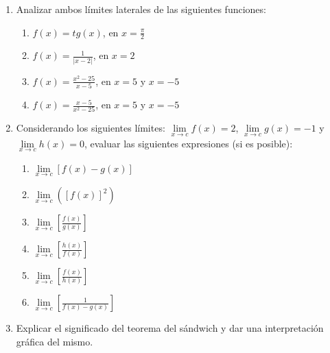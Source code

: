 \documentclass[12pt]{article}
\theoremstyle{definition}
\newtheorem*{myteo2}{Teorema}
\begin{document}
\begin{enumerate}
\item Analizar ambos límites laterales de las siguientes funciones:

\begin{multicols}{2}
	\begin{enumerate}
		\item $f(x) = tg(x)$, en $x = \frac{\pi}{2}$
		\item $f(x) = \frac{1}{|x - 2|}$, en $x = 2$
		\item $f(x) = \frac{x^2 - 25}{x - 5}$, en $x = 5$ y $x = -5$		
		\item $f(x) = \frac{x - 5}{x^2 - 25}$, en $x = 5$ y $x = -5$	
	\end{enumerate}
\end{multicols}

\item Considerando los siguientes límites: $\lim\limits_{x \to c} f(x) = 2$, $\lim\limits_{x \to c} g(x) = -1$ y $\lim\limits_{x \to c} h(x) = 0$, evaluar las siguientes expresiones (si es posible):

\begin{multicols}{3}
\begin{enumerate}
	\item $\lim\limits_{x \to c} \left[f(x) - g(x)\right]$
	\item $\lim\limits_{x \to c} \left(\left[f(x)\right]^2\right)$
	\item $\lim\limits_{x \to c} \left[\frac{f(x)}{g(x)}\right]$
    \item $\lim\limits_{x \to c} \left[\frac{h(x)}{f(x)}\right]$
    \item $\lim\limits_{x \to c} \left[\frac{f(x)}{h(x)}\right]$
    \item $\lim\limits_{x \to c} \left[\frac{1}{f(x) - g(x)}\right]$
\end{enumerate}
\end{multicols}


\item Explicar el significado del teorema del sándwich y dar una interpretación gráfica del mismo.


\end{enumerate}
\end{document}
